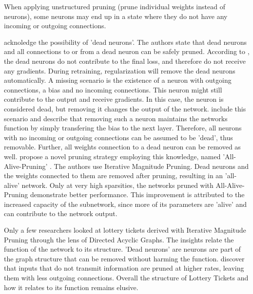 When applying unstructured pruning (prune individual weights instead of neurons), some neurons may end up in a state where they do not have any incoming or outgoing connections. 

\textcite{HanEtAl15} acknoledge the possibility of 'dead neurons'. 
The authors state that dead neurons and all connections to or from a dead neuron can be safely pruned.
According to \autocite{HanEtAl15}, the dead neurons do not contribute to the final loss, and therefore do not receive any gradients. 
During retraining, regularization will remove the dead neurons automatically. 
A missing scenario is the existence of a neuron with outgoing connections, a bias and no incoming connections. This neuron might still contribute to the output and receive gradients. 
In this case, the neuron is considered dead, but removing it changes the output of the network.
\textcite{AllAlivePruning} include this scenario and describe that removing such a neuron maintains the networks function by simply transfering the bias to the next layer. 
Therefore, all neurons with no incoming or outgoing connections can be assumed to be 'dead', thus removable. Further, all weights connection to a dead neuron can be removed as well.
\textcite{AllAlivePruning} propose a novel pruning strategy employing this knowledge, named 'All-Alive-Pruning' . 
The authors use Iterative Magnitude Pruning. Dead neurons and the weights connected to them are removed after pruning, resulting in an 'all-alive' network.
Only at very high sparsities, the networks pruned with All-Alive-Pruning demonstrate better performance. 
This improvement is attributed to the increased capacity of the subnetwork, since more of its parameters are 'alive' and can contribute to the network output.

Only a few researchers looked at lottery tickets derived with Iterative Magnitude Pruning through the lens of Directed Acyclic Graphs. 
The insights relate the function of the network to its structure.
'Dead neurons' \autocite{HanEtAl15, AllAlivePruning} are neurons are part of the graph structure that can be removed without harming the function. 
\textcite{DBLP:conf/iclr/FrankleC19} discover that inputs that do not transmit information are pruned at higher rates, leaving them with less outgoing connections.
Overall the structure of Lottery Tickets and how it relates to its function remains elusive.

